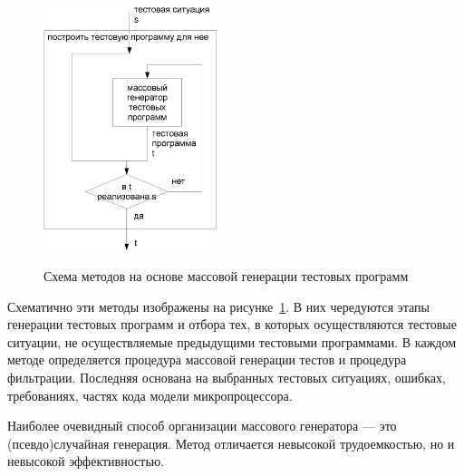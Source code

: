 \begin{figure}[h] \center
  \includegraphics[width=0.45\textwidth]{1.review/methods1}\\
  \caption{Схема методов на основе массовой генерации тестовых программ}\label{fig:massive_methods}
\end{figure}

Схематично эти методы изображены на рисунке~\ref{fig:massive_methods}. В них чередуются этапы генерации тестовых программ и отбора тех, в которых осуществляются тестовые ситуации, не осуществляемые предыдущими тестовыми программами. В каждом методе определяется процедура массовой генерации тестов и процедура фильтрации. Последняя основана на выбранных тестовых ситуациях, ошибках, требованиях, частях кода модели микропроцессора.

Наиболее очевидный способ организации массового генератора --- это (псевдо)случайная генерация. Метод отличается невысокой трудоемкостью, но и невысокой эффективностью.


